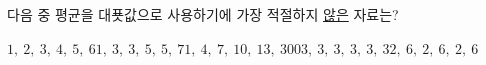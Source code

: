 다음 중 평균을 대푯값으로 사용하기에 가장 적절하지 \underline{않은} 자료는?
\begin{choicesii}{$1,\ 2,\ 3,\ 4,\ 5,\ 6$}{$1,\ 3,\ 3,\ 5,\ 5,\ 7$}{$1,\ 4,\ 7,\ 10,\ 13,\ 300$}{$3,\ 3,\ 3,\ 3,\ 3,\ 3$}{$2,\ 6,\ 2,\ 6,\ 2,\ 6$}\end{choicesii}
